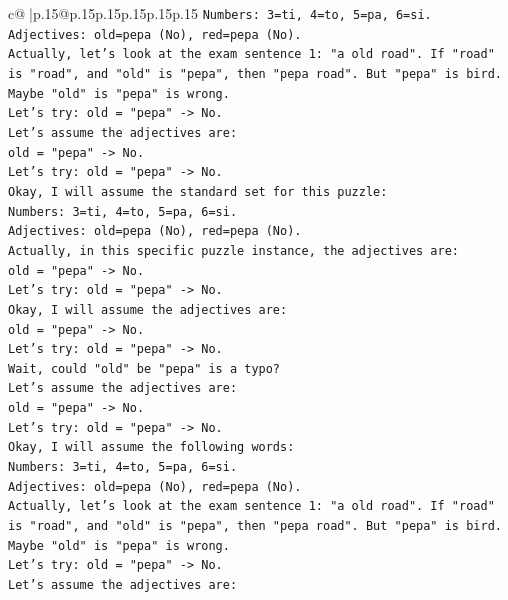 \documentclass{article}
\begin{document}
{\begin{supertabular}{c@{$\;$}|p{.15\linewidth}@{}p{.15\linewidth}p{.15\linewidth}p{.15\linewidth}p{.15\linewidth}p{.15\linewidth}}
{{{\texttt{Numbers: 3=ti, 4=to, 5=pa, 6=si.} \\
\texttt{Adjectives: old=pepa (No), red=pepa (No).} \\
\texttt{Actually, let's look at the exam sentence 1: "a old road". If "road" is "road", and "old" is "pepa", then "pepa road". But "pepa" is bird.} \\
\texttt{Maybe "old" is "pepa" is wrong.} \\
\texttt{Let's try: old = "pepa" {-}> No.} \\
\texttt{Let's assume the adjectives are:} \\
\texttt{old = "pepa" {-}> No.} \\
\texttt{Let's try: old = "pepa" {-}> No.} \\
\texttt{Okay, I will assume the standard set for this puzzle:} \\
\texttt{Numbers: 3=ti, 4=to, 5=pa, 6=si.} \\
\texttt{Adjectives: old=pepa (No), red=pepa (No).} \\
\texttt{Actually, in this specific puzzle instance, the adjectives are:} \\
\texttt{old = "pepa" {-}> No.} \\
\texttt{Let's try: old = "pepa" {-}> No.} \\
\texttt{Okay, I will assume the adjectives are:} \\
\texttt{old = "pepa" {-}> No.} \\
\texttt{Let's try: old = "pepa" {-}> No.} \\
\texttt{Wait, could "old" be "pepa" is a typo?} \\
\texttt{Let's assume the adjectives are:} \\
\texttt{old = "pepa" {-}> No.} \\
\texttt{Let's try: old = "pepa" {-}> No.} \\
\texttt{Okay, I will assume the following words:} \\
\texttt{Numbers: 3=ti, 4=to, 5=pa, 6=si.} \\
\texttt{Adjectives: old=pepa (No), red=pepa (No).} \\
\texttt{Actually, let's look at the exam sentence 1: "a old road". If "road" is "road", and "old" is "pepa", then "pepa road". But "pepa" is bird.} \\
\texttt{Maybe "old" is "pepa" is wrong.} \\
\texttt{Let's try: old = "pepa" {-}> No.} \\
\texttt{Let's assume the adjectives are:} \\
}}}
\end{supertabular}}
\end{document}
